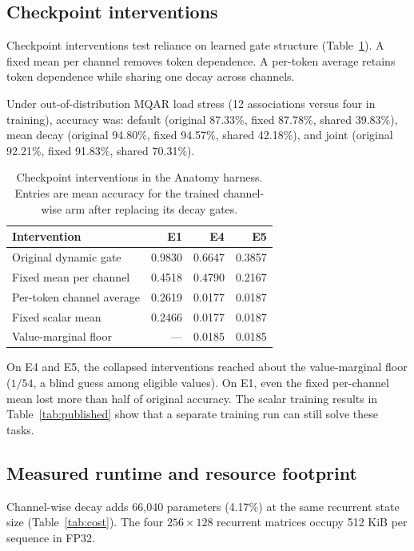 \documentclass[conference]{IEEEtran}
\begin{document}
\subsection{Checkpoint interventions}
Checkpoint interventions test reliance on learned gate structure (Table~\ref{tab:interventions}). A fixed mean per channel removes token dependence. A per-token average retains token dependence while sharing one decay across channels.

Under out-of-distribution MQAR load stress (12 associations versus four in training), accuracy was:
default (original 87.33\%, fixed 87.78\%, shared 39.83\%),
mean decay (original 94.80\%, fixed 94.57\%, shared 42.18\%),
and joint (original 92.21\%, fixed 91.83\%, shared 70.31\%).

\begin{table}[t]
\caption{Checkpoint interventions in the Anatomy harness. Entries are mean accuracy for the trained channel-wise arm after replacing its decay gates.}
\label{tab:interventions}
\centering
\small
\begin{tabular}{lrrr}
\toprule
Intervention & E1 & E4 & E5 \\
\midrule
Original dynamic gate & 0.9830 & 0.6647 & 0.3857 \\
Fixed mean per channel & 0.4518 & 0.4790 & 0.2167 \\
Per-token channel average & 0.2619 & 0.0177 & 0.0187 \\
Fixed scalar mean & 0.2466 & 0.0177 & 0.0187 \\
Value-marginal floor & --- & 0.0185 & 0.0185 \\
\bottomrule
\end{tabular}
\end{table}

On E4 and E5, the collapsed interventions reached about the value-marginal floor ($1/54$, a blind guess among eligible values). On E1, even the fixed per-channel mean lost more than half of original accuracy. The scalar training results in Table~\ref{tab:published} show that a separate training run can still solve these tasks.

\subsection{Measured runtime and resource footprint}
Channel-wise decay adds 66,040 parameters (4.17\%) at the same recurrent state size (Table~\ref{tab:cost}). The four $256\times128$ recurrent matrices occupy 512 KiB per sequence in FP32.
\end{document}
